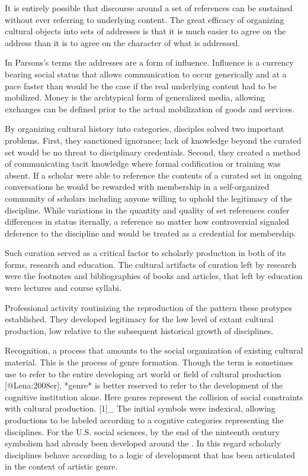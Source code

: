 It is entirely possible that discourse around a set of references can be
sustained without ever referring to underlying content. The great
efficacy of organizing cultural objects into sets of addresses is that
it is much easier to agree on the address than it is to agree on the
character of what is addressed.

In Parsons's terms the addresses are a form of influence. Influence is a
currency bearing social status that allows communication to occur
generically and at a pace faster than would be the case if the real
underlying content had to be mobilized. Money is the archtypical form of
generalized media, allowing exchanges can be defined prior to the actual
mobilization of goods and services.

By organizing cultural history into categories, disciples solved two
important problems. First, they sanctioned ignorance; lack of knowledge
beyond the curated set would be no threat to disciplinary credentials.
Second, they created a method of communicating tacit knowledge where
formal codification or training was absent. If a scholar were able to
reference the contents of a curated set in ongoing conversations he
would be rewarded with membership in a self-organized community of
scholars including anyone willing to uphold the legitimacy of the
discipline. While variations in the quantity and quality of set
references confer differences in status iternally, a reference no matter
how controversial signaled deference to the discipline and would be
treated as a credential for membership.

Such curation served as a critical factor to scholarly production in
both of its forms, research and education. The cultural artifacts of
curation left by research were the footnotes and bibliographies of books
and articles, that left by education were lectures and course syllabi.

Professional activity routinizing the reproduction of the pattern these
protypes established. They developed legitimacy for the low level of
extant cultural production, low relative to the subsequent historical
growth of disciplines.

Recognition, a process that amounts to the social organization of
existing cultural material. This is the process of genre formation.
Though the term is sometimes use to refer to the entire developing art
world or field of cultural production [@Lena:2008er], *genre* is better
reserved to refer to the development of the cognitive institution alone.
Here genres represent the collision of social constraints with cultural
production.  [1]_ The initial symbols were indexical, allowing
productions to be labeled according to a cogntive categories
representing the disciplines. For the U.S. social sciences, by the end
of the ninteenth century symbolism had already been developed around the
. In this regard scholarly disciplines behave according to a logic of
development that has been articulated in the context of artistic genre.

